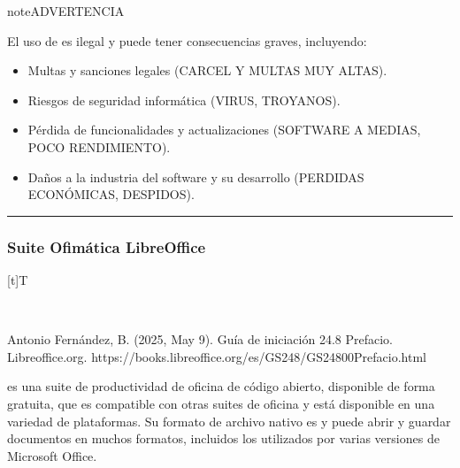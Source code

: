 \documentclass[letterpaper,10pt,spanish]{sphinxmanual}
\let\sphinxpxdimen\pdfpxdimen\else\newdimen\sphinxpxdimen
\begin{document}
\begin{sphinxadmonition}{note}{ADVERTENCIA}

\sphinxAtStartPar
El uso de  es ilegal y puede tener consecuencias graves, incluyendo:
\begin{itemize}
\item {} 
\sphinxAtStartPar
Multas y sanciones legales (CARCEL Y MULTAS MUY ALTAS).

\item {} 
\sphinxAtStartPar
Riesgos de seguridad informática (VIRUS, TROYANOS).

\item {} 
\sphinxAtStartPar
Pérdida de funcionalidades y actualizaciones (SOFTWARE A MEDIAS, POCO RENDIMIENTO).

\item {} 
\sphinxAtStartPar
Daños a la industria del software y su desarrollo (PERDIDAS ECONÓMICAS, DESPIDOS).

\end{itemize}
\end{sphinxadmonition}


\bigskip\hrule\bigskip



\subsubsection{Suite Ofimática LibreOffice}
\label{\detokenize{1_guias/10ofimatica/G1012:suite-ofimatica-libreoffice}}

\begin{savenotes}\sphinxattablestart
\sphinxthistablewithglobalstyle
\centering
\begin{tabulary}{\linewidth}[t]{T}
\sphinxtoprule
\sphinxtableatstartofbodyhook

\begin{sphinxfigure-in-table}
\centering
\capstart
\noindent\sphinxincludegraphics[width=300\sphinxpxdimen]{{image131}.png}
\label{\detokenize{1_guias/10ofimatica/G1012:id53}}\end{sphinxfigure-in-table}\relax
\\
\sphinxbottomrule
\end{tabulary}
\sphinxtableafterendhook\par
\sphinxattableend\end{savenotes}

\sphinxAtStartPar
%
\begin{footnote}[16]\sphinxAtStartFootnote
Antonio Fernández, B. (2025, May 9). Guía de iniciación 24.8 \sphinxhyphen{} Prefacio. Libreoffice.org. https://books.libreoffice.org/es/GS248/GS24800\sphinxhyphen{}Prefacio.html
%
\end{footnote}  es una suite de productividad de oficina de código abierto, disponible de forma gratuita, que es compatible con otras suites de oficina y está disponible en una variedad de plataformas. Su formato de archivo nativo es  y puede abrir y guardar documentos en muchos formatos, incluidos los utilizados por varias versiones de Microsoft Office.
\end{document}
